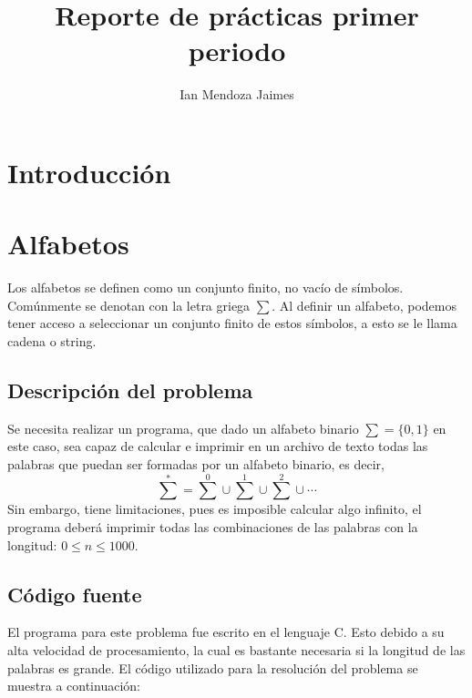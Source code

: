 \documentclass[12pt]{article}
\title{Reporte de prácticas primer periodo}
\author{Ian Mendoza Jaimes}
\begin{document}
\maketitle

\newpage

\tableofcontents

\newpage

\section{Introducción}

\newpage

\section{Alfabetos}
Los alfabetos se definen como un conjunto finito, no vacío de símbolos. Comúnmente se denotan con la letra griega $\sum$. Al definir un alfabeto, podemos tener acceso a seleccionar un conjunto finito de estos símbolos, a esto se le llama cadena o string. \cite{automatas}

\subsection{Descripción del problema}
Se necesita realizar un programa, que dado un alfabeto binario $\sum = \lbrace 0, 1 \rbrace $ en este caso, sea  capaz  de calcular e imprimir en un archivo de texto todas las palabras que puedan ser formadas por un alfabeto binario, es decir, \[{\sum}^{*} = {\sum}^{0}\cup{\sum}^{1}\cup{\sum}^{2}\cup\cdots\] Sin embargo, tiene limitaciones, pues es imposible calcular algo infinito, el programa deberá imprimir todas las combinaciones de las palabras con la longitud: $0 \leq n \leq 1000$.

\subsection{Código fuente}
El programa para este problema fue escrito en el lenguaje C. Esto debido a su alta velocidad de procesamiento, la cual es bastante necesaria si la longitud de las palabras es grande. El código utilizado para la resolución del problema se muestra a continuación:\\
\end{document}
